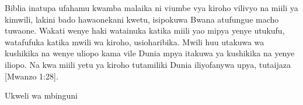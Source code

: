Biblia inatupa ufahamu kwamba malaika ni viumbe vya kiroho vilivyo na miili ya kimwili, lakini bado hawaonekani kwetu, isipokuwa Bwana atufungue macho tuwaone. Wakati wenye haki watainuka katika miili yao mipya yenye utukufu, watafufuka katika mwili wa kiroho, usioharibika. Mwili huu utakuwa wa kushikika na wenye uliopo kama vile Dunia mpya itakuwa ya kushikika na yenye iliopo. Na kwa miili yetu ya kiroho tutamiliki Dunia iliyofanywa upya, tutaijaza [Mwanzo 1:28].





Ukweli wa mbinguni
